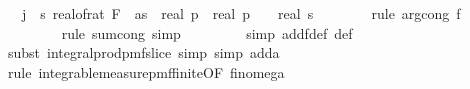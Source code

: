 \begin{isabellebody}
\ {\isachardoublequoteopen}{\isachardot}{\kern0pt}{\isachardot}{\kern0pt}{\isachardot}{\kern0pt}\ {\isacharequal}{\kern0pt}\ {\isacharparenleft}{\kern0pt}{\isasymSum}j\ {\isacharequal}{\kern0pt}\ {}{\isachardot}{\kern0pt}{\isachardot}{\kern0pt}{\isacharless}{\kern0pt}s\ real{\isacharunderscore}{\kern0pt}of{\isacharunderscore}{\kern0pt}rat\ {\isacharparenleft}{\kern0pt}F\ {}\ as{\isacharparenright}{\kern0pt}\ {\isacharasterisk}{\kern0pt}\ {\isacharparenleft}{\kern0pt}{\isacharparenleft}{\kern0pt}real\ p{\isacharparenright}{\kern0pt}\ {\isacharslash}{\kern0pt}\ {\isacharparenleft}{\kern0pt}{\isacharparenleft}{\kern0pt}{\isacharparenleft}{\kern0pt}real\ p{\isacharparenright}{\kern0pt}\ {\isacharminus}{\kern0pt}\ {}{\isacharparenright}{\kern0pt}\ {\isacharasterisk}{\kern0pt}\ real\ s\isanewline
\ \ \ \ \ \ \isamarkupfalse%
\ {\isacharparenleft}{\kern0pt}rule\ arg{\isacharunderscore}{\kern0pt}cong{}{\isacharbrackleft}{\kern0pt}\ f{\isacharequal}{\kern0pt}{\isachardoublequoteopen}{\isacharparenleft}{\kern0pt}{\isacharslash}{\kern0pt}{\isacharparenright}{\kern0pt}{\isachardoublequoteclose}{\isacharbrackright}{\kern0pt}{\isacharparenright}{\kern0pt}\isanewline
\ \ \ \ \ \ \ \isamarkupfalse%
\ {\isacharparenleft}{\kern0pt}rule\ sum{\isachardot}{\kern0pt}cong{\isacharcomma}{\kern0pt}\ simp{\isacharparenright}{\kern0pt}\isanewline
\ \ \ \ \ \ \ \isamarkupfalse%
\ {\isacharparenleft}{\kern0pt}simp\ add{\isacharcolon}{\kern0pt}f{}{\isacharunderscore}{\kern0pt}def\ {\isasymOmega}def{\isacharparenright}{\kern0pt}\isanewline
\ \ \ \ \ \ \ \isamarkupfalse%
\ {\isacharparenleft}{\kern0pt}subst\ integral{\isacharunderscore}{\kern0pt}prod{\isacharunderscore}{\kern0pt}pmf{\isacharunderscore}{\kern0pt}slice{\isacharcomma}{\kern0pt}\ simp{\isacharcomma}{\kern0pt}\ simp\ add{\isacharcolon}{\kern0pt}a{\isacharparenright}{\kern0pt}\isanewline
\ \ \ \ \ \ \ \ \isamarkupfalse%
\ {\isacharparenleft}{\kern0pt}rule\ integrable{\isacharunderscore}{\kern0pt}measure{\isacharunderscore}{\kern0pt}pmf{\isacharunderscore}{\kern0pt}finite{\isacharbrackleft}{\kern0pt}OF\ fin{\isacharunderscore}{\kern0pt}omega{\isacharunderscore}{\kern0pt}{}{\isacharbrackright}{\kern0pt}{\isacharparenright}{\kern0pt}\isanewline

\end{isabellebody}

